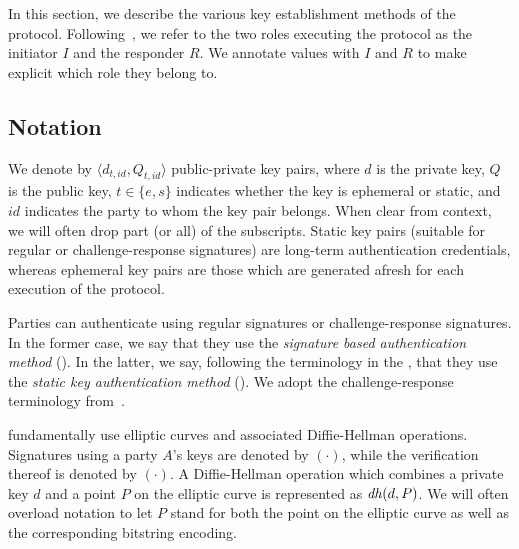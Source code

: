 In this section, we describe the various key establishment methods of the
\mEdhoc{} protocol.
%
Following~\cite{Norr21}, we refer to the two roles executing the protocol as
the initiator $I$ and the responder $R$.
%
We annotate values with $I$ and $R$ to make explicit which role they belong 
to.
%

\subsection{Notation}
\label{sec:notation}
We denote by $\langle d_{t, \mathit{id}}, Q_{t, \mathit{id}}\rangle$
public-private key pairs, where $d$ is the private key, $Q$ is the public key,
$t \in \{e, s\}$ indicates whether the key is ephemeral or static,
and $\mathit{id}$ indicates the party to whom the key pair belongs.
%
When clear from context, we will often drop part (or all) of the subscripts.
%
Static key pairs (suitable for regular or challenge-response signatures)
are long-term authentication credentials, whereas ephemeral key pairs are 
those
which are generated afresh for each execution of the protocol.
%

Parties can authenticate using regular signatures or challenge-response
signatures.
%
In the former case, we say that they use the
\emph{signature based authentication method} (\mSig{}).
%
In the latter, we say, following the terminology in the \mSpec{},
that they use the \emph{static key authentication method} (\mStat{}).
%
We adopt the challenge-response terminology
from~\cite{DBLP:conf/crypto/Krawczyk05}.
%

\mEdhoc{} fundamentally use elliptic curves and associated Diffie-Hellman
operations.
%
Signatures using a party $A$'s keys are denoted by $(\cdot)$, while
the verification thereof is denoted by $(\cdot)$.
%
A Diffie-Hellman operation which combines a private key $d$ and a point $P$
on the elliptic curve is represented as $\mathit{dh}(d, P)$.
%
We will often overload notation to let $P$ stand for both the point on the
elliptic curve as well as the corresponding bitstring encoding.
%
%
%

